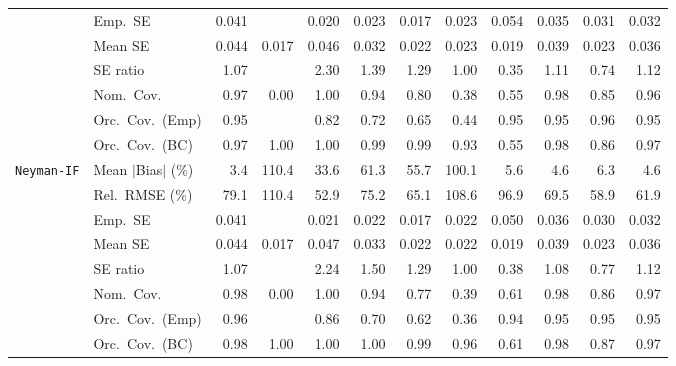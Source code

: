 \begin{landscape}
\begin{longtable}{llrrrrrrrrrr}
 & Emp.\ SE & 0.041 &  & 0.020 & 0.023 & 0.017 & 0.023 & 0.054 & 0.035 & 0.031 & 0.032 \\
 & Mean SE & 0.044 & 0.017 & 0.046 & 0.032 & 0.022 & 0.023 & 0.019 & 0.039 & 0.023 & 0.036 \\
 & SE ratio & \cellcolor{ranktwo}1.07 &  & 2.30 & 1.39 & 1.29 & \cellcolor{rankone}1.00 & 0.35 & \cellcolor{rankthree}1.11 & 0.74 & 1.12 \\
 & Nom.\ Cov. & \cellcolor{ranktwo}0.97 & 0.00 & 1.00 & \cellcolor{rankone}0.94 & 0.80 & 0.38 & 0.55 & \cellcolor{rankthree}0.98 & 0.85 & \cellcolor{rankone}0.96 \\
 & Orc.\ Cov.\ (Emp) & \cellcolor{rankone}0.95 &  & \cellcolor{rankthree}0.82 & 0.72 & 0.65 & 0.44 & \cellcolor{rankone}0.95 & \cellcolor{rankone}0.95 & \cellcolor{ranktwo}0.96 & \cellcolor{rankone}0.95 \\
 & Orc.\ Cov.\ (BC) & \cellcolor{rankone}0.97 & 1.00 & 1.00 & \cellcolor{rankthree}0.99 & \cellcolor{rankthree}0.99 & \cellcolor{rankone}0.93 & 0.55 & \cellcolor{ranktwo}0.98 & 0.86 & \cellcolor{rankone}0.97 \\
\addlinespace[2pt]
\quad \texttt{Neyman-IF} & Mean $|$Bias$|$ (\%) & \cellcolor{rankone}3.4 & 110.4 & 33.6 & 61.3 & 55.7 & 100.1 & \cellcolor{rankthree}5.6 & \cellcolor{ranktwo}4.6 & 6.3 & \cellcolor{ranktwo}4.6 \\
 & Rel.\ RMSE (\%) & 79.1 & 110.4 & \cellcolor{rankone}52.9 & 75.2 & 65.1 & 108.6 & 96.9 & 69.5 & \cellcolor{ranktwo}58.9 & \cellcolor{rankthree}61.9 \\
 & Emp.\ SE & 0.041 &  & 0.021 & 0.022 & 0.017 & 0.022 & 0.050 & 0.036 & 0.030 & 0.032 \\
 & Mean SE & 0.044 & 0.017 & 0.047 & 0.033 & 0.022 & 0.022 & 0.019 & 0.039 & 0.023 & 0.036 \\
 & SE ratio & \cellcolor{ranktwo}1.07 &  & 2.24 & 1.50 & 1.29 & \cellcolor{rankone}1.00 & 0.38 & \cellcolor{rankthree}1.08 & 0.77 & 1.12 \\
 & Nom.\ Cov. & \cellcolor{rankthree}0.98 & 0.00 & 1.00 & \cellcolor{rankone}0.94 & 0.77 & 0.39 & 0.61 & \cellcolor{rankthree}0.98 & 0.86 & \cellcolor{ranktwo}0.97 \\
 & Orc.\ Cov.\ (Emp) & \cellcolor{ranktwo}0.96 &  & \cellcolor{rankthree}0.86 & 0.70 & 0.62 & 0.36 & \cellcolor{ranktwo}0.94 & \cellcolor{rankone}0.95 & \cellcolor{rankone}0.95 & \cellcolor{rankone}0.95 \\
 & Orc.\ Cov.\ (BC) & \cellcolor{rankthree}0.98 & 1.00 & 1.00 & 1.00 & 0.99 & \cellcolor{rankone}0.96 & 0.61 & \cellcolor{rankthree}0.98 & 0.87 & \cellcolor{ranktwo}0.97 \\

\end{longtable}
\end{landscape}
